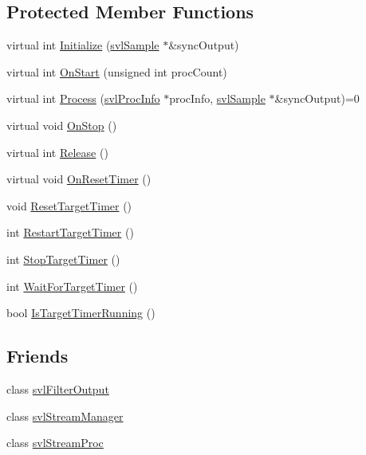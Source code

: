 \subsection*{Protected Member Functions}
\begin{DoxyCompactItemize}
\item 
virtual int \hyperlink{classsvl_filter_source_base_a7fea7ec5ddd6eb315f482fce965e2cc9}{Initialize} (\hyperlink{classsvl_sample}{svl\+Sample} $\ast$\&sync\+Output)
\item 
virtual int \hyperlink{classsvl_filter_source_base_a3b829c812d5a24d99068c0f56b632d11}{On\+Start} (unsigned int proc\+Count)
\item 
virtual int \hyperlink{classsvl_filter_source_base_a6d50fd7ef217d1d760c76e325169ecaf}{Process} (\hyperlink{structsvl_proc_info}{svl\+Proc\+Info} $\ast$proc\+Info, \hyperlink{classsvl_sample}{svl\+Sample} $\ast$\&sync\+Output)=0
\item 
virtual void \hyperlink{classsvl_filter_source_base_a62b3a81c6ee6db846616726ecc34a902}{On\+Stop} ()
\item 
virtual int \hyperlink{classsvl_filter_source_base_a358d2a26ad00dad3f7a4a6aa965f9032}{Release} ()
\item 
virtual void \hyperlink{classsvl_filter_source_base_a2a103fefe9d4e53c50be43a7f39c2120}{On\+Reset\+Timer} ()
\item 
void \hyperlink{classsvl_filter_source_base_ad6037ac4e48119108118f267f158d853}{Reset\+Target\+Timer} ()
\item 
int \hyperlink{classsvl_filter_source_base_a944e2b8830459bad150018518a780d1b}{Restart\+Target\+Timer} ()
\item 
int \hyperlink{classsvl_filter_source_base_ae744047eaaaa2ece40651a000044811c}{Stop\+Target\+Timer} ()
\item 
int \hyperlink{classsvl_filter_source_base_a8282cf8b67c209b025ab956a8269cb61}{Wait\+For\+Target\+Timer} ()
\item 
bool \hyperlink{classsvl_filter_source_base_aaae4e6e333924cee086e1ebc9a85de21}{Is\+Target\+Timer\+Running} ()
\end{DoxyCompactItemize}
\subsection*{Friends}
\begin{DoxyCompactItemize}
\item 
class \hyperlink{classsvl_filter_source_base_a3f45c3511fc124d190c8ffb5953025f6}{svl\+Filter\+Output}
\item 
class \hyperlink{classsvl_filter_source_base_ab5eee58544f2ce644140e932afbe32db}{svl\+Stream\+Manager}
\item 
class \hyperlink{classsvl_filter_source_base_a6a9ee1dec5ca263793dca09411295245}{svl\+Stream\+Proc}
\end{DoxyCompactItemize}
